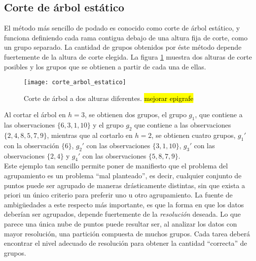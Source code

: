 \subsection{Corte de árbol estático}
El método más sencillo de podado es conocido como corte de árbol estático, y funciona definiendo cada rama contigua debajo de una altura fija de corte, como un grupo separado. La cantidad de grupos obtenidos por éste método depende fuertemente de la altura de  corte elegida. La figura \ref{fig:corte_arbol_estatico} muestra dos alturas de corte posibles y los grupos que se obtienen a partir de cada una de ellas.
\begin{figure}[h]
    \centering
    \texttt{[image: corte\_arbol\_estatico]}
    \caption{Corte de árbol a dos alturas diferentes. \hl{mejorar epigrafe}}
    \label{fig:corte_arbol_estatico}
\end{figure}
Al cortar el árbol en $h=3$, se obtienen dos grupos, el grupo $g_1$, que contiene a las observaciones $\{6, 3, 1, 10\}$ y el grupo $g_2$ que contiene a las observaciones $\{2, 4, 8, 5, 7, 9\}$, mientras que al cortarlo en $h=2$, se obtienen cuatro grupos, $g_1'$ con la observación $\{6\}$, $g_2'$ con las observaciones $\{3, 1, 10\}$, $g_3'$ con las observaciones $\{2, 4\}$ y $g_4'$ con las observaciones $\{5, 8, 7, 9\}$.\\
Este ejemplo tan sencillo permite poner de manifiesto que el problema del agrupamiento es un problema ``mal planteado'', es decir, cualquier conjunto de puntos puede ser agrupado de maneras drásticamente distintas, sin que exista a priori un único criterio para preferir uno u otro agrupamiento. La fuente de ambigüedades a este respecto más importante, es que la forma en que los datos deberían ser agrupados, depende fuertemente de la \textit{resolución} deseada. Lo que parece una única nube de puntos puede resultar ser, al analizar los datos con mayor resolución, una partición compuesta de muchos grupos. Cada tarea deberá encontrar el nivel adecuado de resolución para obtener la cantidad ``correcta'' de grupos.\cite{Domany1999}\cite{Langfelder2008}
